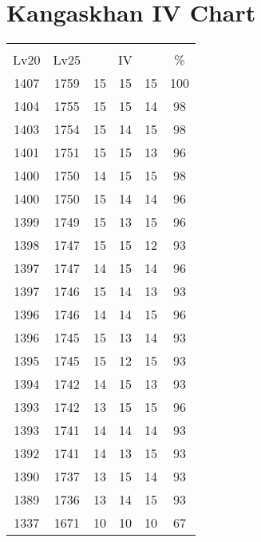 \documentclass{article}%
\begin{document}
%
\normalsize%
\section{Kangaskhan IV Chart}%
\label{sec:Kangaskhan IV Chart}%
\renewcommand{\arraystretch}{1.5}%
\begin{tabular}{|c|c|c|c|c|c|}%
\hline%
\multicolumn{6}{|c|}{\textcolor{white}{ 
\linebreak{Kangaskhan}
}%
\cellcolor{black}}\\%
\multicolumn{1}{|c}{Lv20}&\multicolumn{1}{c|}{Lv25}&\multicolumn{3}{c|}{IV}&\multicolumn{1}{|c|}{\%}\\%
\hline%
\rowcolor{color100}%
1407&1759&15&15&15&100\\%
\hline%
\rowcolor{color98}%
1404&1755&15&15&14&98\\%
\hline%
\rowcolor{color98}%
1403&1754&15&14&15&98\\%
\hline%
\rowcolor{color96}%
1401&1751&15&15&13&96\\%
\hline%
\rowcolor{color98}%
1400&1750&14&15&15&98\\%
\hline%
\rowcolor{color96}%
1400&1750&15&14&14&96\\%
\hline%
\rowcolor{color96}%
1399&1749&15&13&15&96\\%
\hline%
\rowcolor{color93}%
1398&1747&15&15&12&93\\%
\hline%
\rowcolor{color96}%
1397&1747&14&15&14&96\\%
\hline%
\rowcolor{color93}%
1397&1746&15&14&13&93\\%
\hline%
\rowcolor{color96}%
1396&1746&14&14&15&96\\%
\hline%
\rowcolor{color93}%
1396&1745&15&13&14&93\\%
\hline%
\rowcolor{color93}%
1395&1745&15&12&15&93\\%
\hline%
\rowcolor{color93}%
1394&1742&14&15&13&93\\%
\hline%
\rowcolor{color96}%
1393&1742&13&15&15&96\\%
\hline%
\rowcolor{color93}%
1393&1741&14&14&14&93\\%
\hline%
\rowcolor{color93}%
1392&1741&14&13&15&93\\%
\hline%
\rowcolor{color93}%
1390&1737&13&15&14&93\\%
\hline%
\rowcolor{color93}%
1389&1736&13&14&15&93\\%
\hline%
\rowcolor{color91}%
1337&1671&10&10&10&67\\%
\end{tabular}

%
\end{document}
